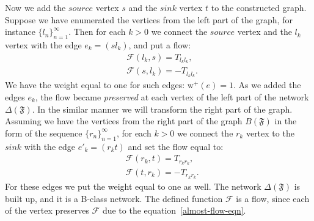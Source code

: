 \documentclass[12pt]{article}
\theoremstyle{definition}
\newtheorem{remark}{Remark}
\newtheorem{definition}{Definition}
\newcommand{\seq}[1]{\{{#1}_n\}_{n=1}^\infty}
\newcommand{\fsys}{\mathfrak{F}}
\newcommand{\wtp}{\mathrm{w}^{+}}
\newcommand{\flow}{\mathcal{F}}
\newcommand{\source}{\mathit{source}}
\newcommand{\sink}{\mathit{sink}}
\newcommand{\net}{\Delta}
\numberwithin{remark}{section}
\numberwithin{theorem}{section}
\numberwithin{prop}{section}
\numberwithin{equation}{section}
\numberwithin{lemma}{section}
\numberwithin{prop_under_lemma}{lemma}
\begin{document}
    Now we add the $\source$ vertex $s$ and the $\sink$ vertex $t$ to the constructed graph.
    Suppose we have enumerated the vertices from the left part of the graph, for instance $\seq{l}$.
    Then for each $k > 0$ we connect the $\source$ vertex and the $l_k$ vertex with
      the edge $e_k = (s l_k)$, and put a flow:
    \begin{align*}
      &\flow(l_k, s) = T_{l_k l_k},\\
      &\flow(s, l_k) = -T_{l_k l_k}.
    \end{align*}
    We have the weight equal to one for such edges: $\wtp(e) = 1$.
    As we added the edges ${e_k}$, the flow became \emph{preserved} at each vertex of the left part of the network $\net(\fsys)$.
    In the similar manner we will transform the right part of the graph.
    Assuming we have the vertices from the right part of the graph $B(\fsys)$ in the form of the sequence $\seq{r}$,
      for each $k > 0$ we connect the $r_k$ vertex to the $\sink$ with the edge $e'_k=(r_k t)$
      and set the flow equal to:
    \begin{align*}
      &\flow(r_k, t) = T_{r_k r_k},\\
      &\flow(t, r_k) = -T_{r_k r_k}.
    \end{align*}
    For these edges we put the weight equal to one as well.
    The network $\net(\fsys)$ is built up, and it is a B-class network.
    The defined function $\flow$ is a flow, since each of the vertex preserves
      $\flow$ due to the equation~\eqref{almost-flow-eqn}.
\end{document}

